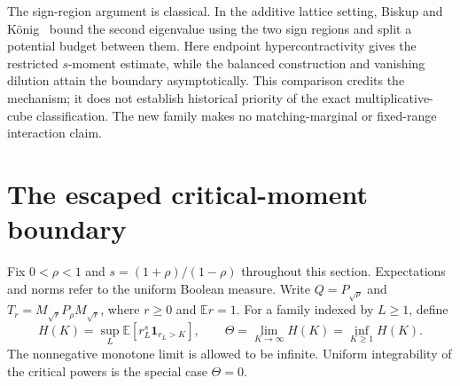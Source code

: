 \documentclass[11pt]{article}
\begin{document}
The sign-region argument is classical. In the additive lattice setting,
Biskup and K\"onig~\cite[Lemma~4.5 and Eq.~(4.29)]{BiskupKoenig}
bound the second eigenvalue using the two sign regions and split a
potential budget between them. Here endpoint hypercontractivity gives
the restricted $s$-moment estimate, while the balanced construction
and vanishing dilution attain the boundary asymptotically. This
comparison credits the mechanism; it does not establish historical
priority of the exact multiplicative-cube classification. The new
family makes no matching-marginal or fixed-range interaction claim.


\section{The escaped critical-moment boundary}
\label{sec:critical-tails}
Fix $0<\rho<1$ and $s=(1+\rho)/(1-\rho)$ throughout this section.
Expectations and norms refer to the uniform Boolean measure. Write
$Q=P_{\sqrt\rho}$ and $T_r=M_{\sqrt r}P_\rho M_{\sqrt r}$, where
$r\ge0$ and $\mathbb E r=1$. For a family indexed by $L\ge1$, define
\[
 H(K)=\sup_L\mathbb E[r_L^s\mathbf1_{r_L>K}],\qquad
 \Theta=\lim_{K\to\infty}H(K)=\inf_{K\ge1}H(K).
\]
The nonnegative monotone limit is allowed to be infinite. Uniform
integrability of the critical powers is the special case $\Theta=0$.
\end{document}

